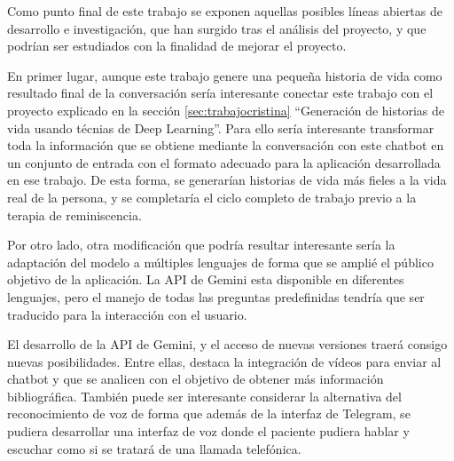 Como punto final de este trabajo se exponen aquellas posibles líneas abiertas de desarrollo e investigación, que han surgido tras el análisis del proyecto, y que podrían ser estudiados con la finalidad de mejorar el proyecto. 

En primer lugar, aunque este trabajo genere una pequeña historia de vida como resultado final de la conversación sería interesante conectar este trabajo con el proyecto explicado en la sección \ref{sec:trabajocristina} ``Generación de historias de vida usando técnias de Deep Learning''. Para ello sería interesante transformar toda la información que se obtiene mediante la conversación con este chatbot en un conjunto de entrada con el formato adecuado para la aplicación desarrollada en ese trabajo. De esta forma, se generarían historias de vida más fieles a la vida real de la persona, y se completaría el ciclo completo de trabajo previo a la terapia de reminiscencia. 

Por otro lado, otra modificación que podría resultar interesante sería la adaptación del modelo a múltiples lenguajes de forma que se amplié el público objetivo de la aplicación. La API de Gemini esta disponible en diferentes lenguajes, pero el manejo de todas las preguntas predefinidas tendría que ser traducido para la interacción con el usuario. 

El desarrollo de la API de Gemini, y el acceso de nuevas versiones traerá consigo nuevas posibilidades. Entre ellas, destaca la integración de vídeos para enviar al chatbot y que se analicen con el objetivo de obtener más información bibliográfica. También puede ser interesante considerar la alternativa del reconocimiento de voz de forma que además de la interfaz de Telegram, se pudiera desarrollar una interfaz de voz donde el paciente pudiera hablar y escuchar como si se tratará de una llamada telefónica.
